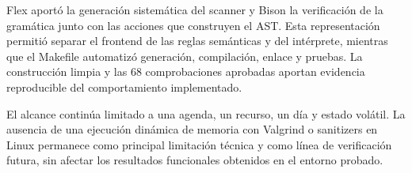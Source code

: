 \documentclass[runningheads]{llncs}
\begin{document}
Flex aportó la generación sistemática del scanner y Bison la verificación de la
gramática junto con las acciones que construyen el AST. Esta representación
permitió separar el frontend de las reglas semánticas y del intérprete, mientras
que el Makefile automatizó generación, compilación, enlace y pruebas. La
construcción limpia y las 68 comprobaciones aprobadas aportan evidencia
reproducible del comportamiento implementado.

El alcance continúa limitado a una agenda, un recurso, un día y estado volátil.
La ausencia de una ejecución dinámica de memoria con Valgrind o sanitizers en
Linux permanece como principal limitación técnica y como línea de verificación
futura, sin afectar los resultados funcionales obtenidos en el entorno probado.



\end{document}
